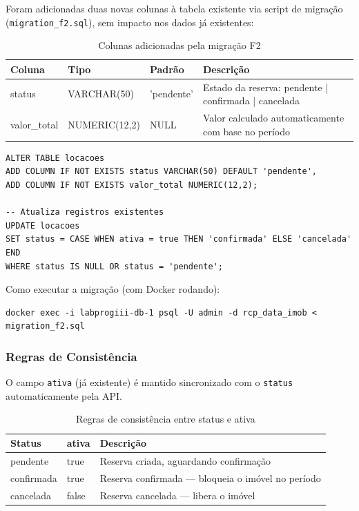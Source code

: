 \documentclass[12pt, a4paper]{article}
\newcommand{\thead}[1]{\cellcolor{tableheader}\color{white}\bfseries #1}
\newcommand{\talt}{\rowcolor{tablerowalt}}
\begin{document}
Foram adicionadas duas novas colunas à tabela existente via script de migração (\texttt{migration\_f2.sql}), sem impacto nos dados já existentes:

\begin{table}[H]
\centering
\begin{tabularx}{\textwidth}{|l|l|l|X|}
\hline
\thead{Coluna} & \thead{Tipo} & \thead{Padrão} & \thead{Descrição} \\
\hline
status      & VARCHAR(50)   & 'pendente' & Estado da reserva: pendente | confirmada | cancelada \\
\talt valor\_total & NUMERIC(12,2) & NULL       & Valor calculado automaticamente com base no período \\
\hline
\end{tabularx}
\caption{Colunas adicionadas pela migração F2}
\end{table}

\begin{lstlisting}[language=SQL2]
ALTER TABLE locacoes
ADD COLUMN IF NOT EXISTS status VARCHAR(50) DEFAULT 'pendente',
ADD COLUMN IF NOT EXISTS valor_total NUMERIC(12,2);

-- Atualiza registros existentes
UPDATE locacoes
SET status = CASE WHEN ativa = true THEN 'confirmada' ELSE 'cancelada' END
WHERE status IS NULL OR status = 'pendente';
\end{lstlisting}

Como executar a migração (com Docker rodando):

\begin{lstlisting}
docker exec -i labprogiii-db-1 psql -U admin -d rcp_data_imob < migration_f2.sql
\end{lstlisting}

\subsubsection{Regras de Consistência}

O campo \texttt{ativa} (já existente) é mantido sincronizado com o \texttt{status} automaticamente pela API.

\begin{table}[H]
\centering
\begin{tabularx}{\textwidth}{|l|l|X|}
\hline
\thead{Status} & \thead{ativa} & \thead{Descrição} \\
\hline
pendente   & true  & Reserva criada, aguardando confirmação \\
\talt confirmada & true  & Reserva confirmada — bloqueia o imóvel no período \\
cancelada  & false & Reserva cancelada — libera o imóvel \\
\hline
\end{tabularx}
\caption{Regras de consistência entre status e ativa}
\end{table}
\end{document}
